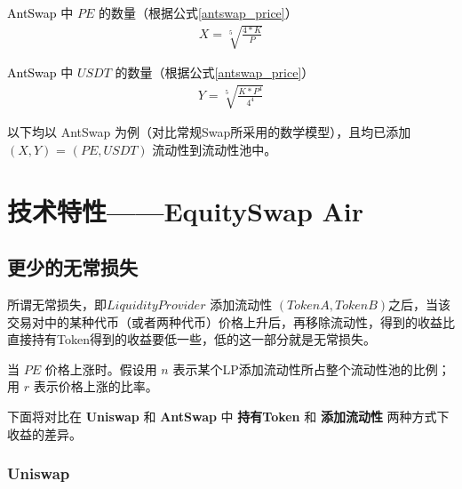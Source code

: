 \documentclass{article}
\begin{document}
\textcolor{black}{AntSwap} 中 $PE$ 的数量（根据公式\ref{antswap_price}）
\begin{equation} \label{antswap_count_eth}
\begin{split}
X = \sqrt[5]{\frac{4*K}{P}}
\end{split}
\end{equation}

\textcolor{black}{AntSwap} 中 $USDT$ 的数量（根据公式\ref{antswap_price}）
\begin{equation} \label{antswap_count_usdt}
\begin{split}
Y = \sqrt[5]{\frac{K * P^4}{4^4}}
\end{split}
\end{equation}

以下均以 AntSwap 为例（对比常规Swap所采用的数学模型），且均已添加$(X, Y)$ = $(PE, USDT)$ 流动性到流动性池中。

\section{技术特性——EquitySwap Air}

\subsection{更少的无常损失}

所谓无常损失，即$Liquidity Provider$ 添加流动性 $(TokenA, TokenB)$之后，当该交易对中的某种代币（或者两种代币）价格上升后，再移除流动性，得到的收益比直接持有Token得到的收益要低一些，低的这一部分就是无常损失。

当 $PE$ 价格上涨时。假设用 $n$ 表示某个LP添加流动性所占整个流动性池的比例；用 $r$ 表示价格上涨的比率。

下面将对比在 \textbf{Uniswap} 和 \textbf{AntSwap} 中 \textbf{持有Token} 和 \textbf{添加流动性} 两种方式下收益的差异。

\subsubsection{Uniswap}


\end{document}
